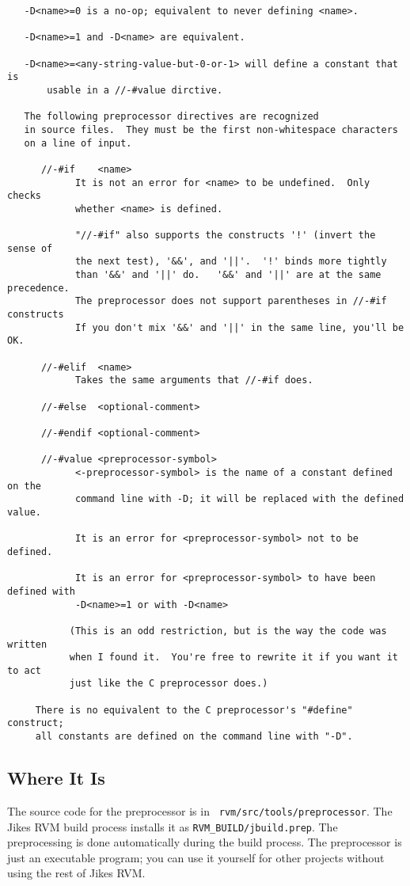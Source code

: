 \begin{verbatim}
   -D<name>=0 is a no-op; equivalent to never defining <name>.

   -D<name>=1 and -D<name> are equivalent.

   -D<name>=<any-string-value-but-0-or-1> will define a constant that is
       usable in a //-#value dirctive.

   The following preprocessor directives are recognized
   in source files.  They must be the first non-whitespace characters
   on a line of input.

      //-#if    <name>
            It is not an error for <name> to be undefined.  Only checks
            whether <name> is defined.

            "//-#if" also supports the constructs '!' (invert the sense of 
            the next test), '&&', and '||'.  '!' binds more tightly 
            than '&&' and '||' do.   '&&' and '||' are at the same precedence.
            The preprocessor does not support parentheses in //-#if constructs
            If you don't mix '&&' and '||' in the same line, you'll be OK.

      //-#elif  <name>
            Takes the same arguments that //-#if does. 

      //-#else  <optional-comment>

      //-#endif <optional-comment>

      //-#value <preprocessor-symbol>
            <-preprocessor-symbol> is the name of a constant defined on the
            command line with -D; it will be replaced with the defined value.

            It is an error for <preprocessor-symbol> not to be defined.

            It is an error for <preprocessor-symbol> to have been defined with
            -D<name>=1 or with -D<name>

           (This is an odd restriction, but is the way the code was written
           when I found it.  You're free to rewrite it if you want it to act
           just like the C preprocessor does.)

     There is no equivalent to the C preprocessor's "#define" construct;
     all constants are defined on the command line with "-D".
\end{verbatim}

\subsection{Where It Is}

The source code for the preprocessor is in {\tt
rvm/src/tools/preprocessor}.  The Jikes RVM build process installs it
as {\tt RVM\_BUILD/jbuild.prep}.  The preprocessing is done automatically
during the build process.  The preprocessor is just an executable
program; you can use it yourself for other projects without using the
rest of Jikes RVM.


